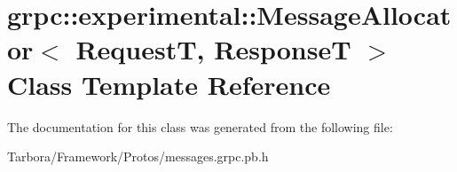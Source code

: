 \hypertarget{classgrpc_1_1experimental_1_1MessageAllocator}{}\section{grpc\+:\+:experimental\+:\+:Message\+Allocator$<$ RequestT, ResponseT $>$ Class Template Reference}
\label{classgrpc_1_1experimental_1_1MessageAllocator}


The documentation for this class was generated from the following file\+:\begin{DoxyCompactItemize}
\item 
Tarbora/\+Framework/\+Protos/messages.\+grpc.\+pb.\+h\end{DoxyCompactItemize}
